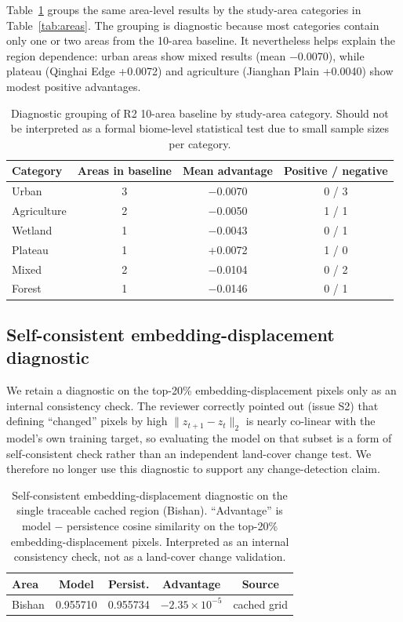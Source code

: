 \documentclass{article}
\begin{document}
Table~\ref{tab:category_diagnostic} groups the same area-level results by the study-area categories in Table~\ref{tab:areas}. The grouping is diagnostic because most categories contain only one or two areas from the 10-area baseline. It nevertheless helps explain the region dependence: urban areas show mixed results (mean $-$0.0070), while plateau (Qinghai Edge +0.0072) and agriculture (Jianghan Plain +0.0040) show modest positive advantages.

\begin{table}[htbp]
\centering
\caption{Diagnostic grouping of R2 10-area baseline by study-area category. Should not be interpreted as a formal biome-level statistical test due to small sample sizes per category.}
\label{tab:category_diagnostic}
\small
\begin{tabular}{lccc}
\toprule
Category & Areas in baseline & Mean advantage & Positive / negative \\
\midrule
Urban & 3 & $-$0.0070 & 0 / 3 \\
Agriculture & 2 & $-$0.0050 & 1 / 1 \\
Wetland & 1 & $-$0.0043 & 0 / 1 \\
Plateau & 1 & +0.0072 & 1 / 0 \\
Mixed & 2 & $-$0.0104 & 0 / 2 \\
Forest & 1 & $-$0.0146 & 0 / 1 \\
\bottomrule
\end{tabular}
\end{table}

\subsection{Self-consistent embedding-displacement diagnostic}
\label{sec:embedding_displacement_diagnostic}

We retain a diagnostic on the top-20\% embedding-displacement pixels only as an internal consistency check. The reviewer correctly pointed out (issue S2) that defining ``changed'' pixels by high $\|z_{t+1}-z_t\|_2$ is nearly co-linear with the model's own training target, so evaluating the model on that subset is a form of self-consistent check rather than an independent land-cover change test. We therefore no longer use this diagnostic to support any change-detection claim.

\begin{table}[htbp]
\centering
\caption{Self-consistent embedding-displacement diagnostic on the single traceable cached region (Bishan). ``Advantage'' is model $-$ persistence cosine similarity on the top-20\% embedding-displacement pixels. Interpreted as an internal consistency check, not as a land-cover change validation.}
\label{tab:changepixel}
\begin{tabular}{lcccc}
\toprule
Area & Model & Persist. & Advantage & Source \\
\midrule
Bishan & 0.955710 & 0.955734 & $-2.35 \times 10^{-5}$ & cached grid \\
\bottomrule
\end{tabular}
\end{table}
\end{document}
